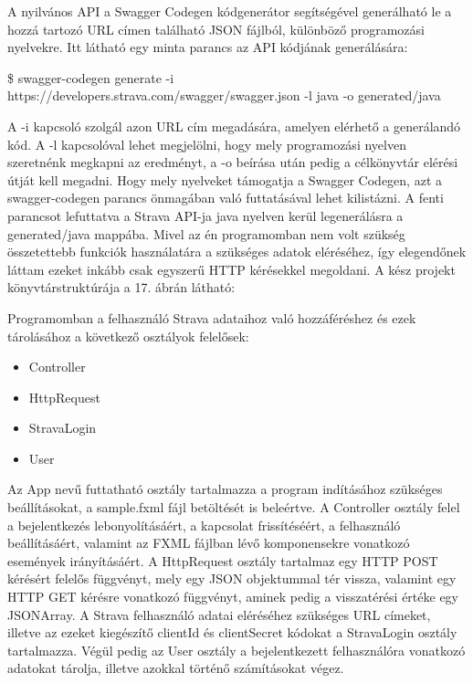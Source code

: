 A nyilvános API a Swagger Codegen kódgenerátor segítségével generálható le a hozzá tartozó URL címen található JSON fájlból, különböző programozási nyelvekre. Itt látható egy minta parancs az API kódjának generálására: 

\$ swagger-codegen generate -i https://developers.strava.com/swagger/swagger.json -l java -o generated/java 


A -i kapcsoló szolgál azon URL cím megadására, amelyen elérhető a generálandó kód. A -l kapcsolóval lehet megjelölni, hogy mely programozási nyelven szeretnénk megkapni az eredményt, a -o beírása után pedig a célkönyvtár elérési útját kell megadni. Hogy mely nyelveket támogatja a Swagger Codegen, azt a swagger-codegen parancs önmagában való futtatásával lehet kilistázni. A fenti parancsot lefuttatva a Strava API-ja java nyelven kerül legenerálásra a generated/java mappába. Mivel az én programomban nem volt szükség összetettebb funkciók használatára a szükséges adatok eléréséhez, így elegendőnek láttam ezeket inkább csak egyszerű HTTP kérésekkel megoldani. A kész projekt könyvtárstruktúrája a 17. ábrán látható: 



Programomban a felhasználó Strava adataihoz való hozzáféréshez és ezek tárolásához a következő osztályok felelősek: 

\begin{itemize}
\item Controller 
\item HttpRequest
\item StravaLogin 
\item User
\end{itemize}
 

Az App nevű futtatható osztály tartalmazza a program indításához szükséges beállításokat, a sample.fxml fájl betöltését is beleértve. A Controller osztály felel a bejelentkezés lebonyolításáért, a kapcsolat frissítéséért, a felhasználó beállításáért, valamint az FXML fájlban lévő komponensekre vonatkozó események irányításáért. A HttpRequest osztály tartalmaz egy HTTP POST kérésért felelős függvényt, mely egy JSON objektummal tér vissza, valamint egy HTTP GET kérésre vonatkozó függvényt, aminek pedig a visszatérési értéke egy JSONArray. A Strava felhasználó adatai eléréséhez szükséges URL címeket, illetve az ezeket kiegészítő clientId és clientSecret kódokat a StravaLogin osztály tartalmazza. Végül pedig az User osztály a bejelentkezett felhasználóra vonatkozó adatokat tárolja, illetve azokkal történő számításokat végez. 

